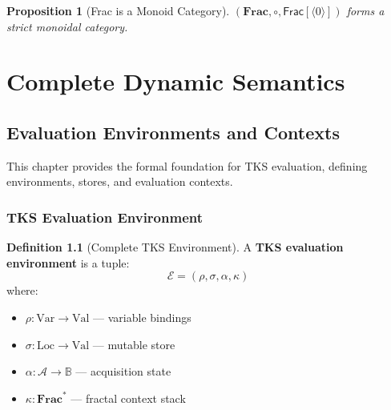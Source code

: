\documentclass[11pt,twoside,openright]{book}
\theoremstyle{definition}
\newtheorem{definition}{Definition}[chapter]
\theoremstyle{plain}
\newtheorem{proposition}[definition]{Proposition}
\theoremstyle{remark}
\newcommand{\Acquisitions}{\mathcal{A}}
\newcommand{\FracSet}{\mathbf{Frac}}
\newcommand{\vnew}{\textcolor{blue!70!black}{\textbf{[NEW v7.0]}}}
\begin{document}
\begin{proposition}[Frac is a Monoid Category]
\label{prop:frac-monoid}
$(\mathbf{Frac}, \circ, \mathsf{Frac}[\langle 0 \rangle])$ forms a strict monoidal category.
\end{proposition}


\part{Complete Dynamic Semantics}

\chapter{Evaluation Environments and Contexts}
\label{ch:eval-env}

\begin{tcolorbox}[colback=blue!5!white,colframe=blue!75!black,title=\vnew]
This chapter provides the formal foundation for TKS evaluation, defining environments, stores, and evaluation contexts.
\end{tcolorbox}

\section{TKS Evaluation Environment}

\begin{definition}[Complete TKS Environment]
\label{def:tks-environment}
A \textbf{TKS evaluation environment} is a tuple:
\[
\mathcal{E} = (\rho, \sigma, \alpha, \kappa)
\]
where:
\begin{itemize}
  \item $\rho : \mathrm{Var} \to \mathrm{Val}$ --- variable bindings
  \item $\sigma : \mathrm{Loc} \to \mathrm{Val}$ --- mutable store
  \item $\alpha : \Acquisitions \to \mathbb{B}$ --- acquisition state
  \item $\kappa : \FracSet^*$ --- fractal context stack
\end{itemize}
\end{definition}
\end{document}
